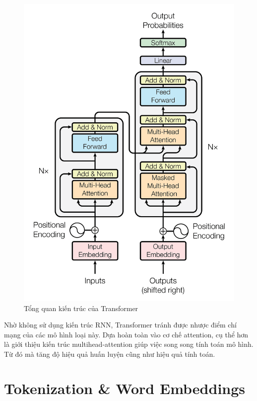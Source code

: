 \begin{figure}[H]
    \begin{center}
        \includegraphics[scale=0.25]{images/attention-is-all-you-need}
        \caption{Tổng quan kiến trúc của Transformer}
        \label{fig:attetion-is-all-you-need}
    \end{center}
\end{figure}

Nhờ không sử dụng kiến trúc RNN, Transformer tránh được nhược điểm chí mạng của các mô hình loại này. Dựa hoàn toàn vào cơ chế attention, cụ thể hơn là giới thiệu kiến trúc multihead-attention giúp việc song song tính toán mô hình. Từ đó mà tăng độ hiệu quả huấn luyện cũng như hiệu quả tính toán.

\section{Tokenization \& Word Embeddings}


